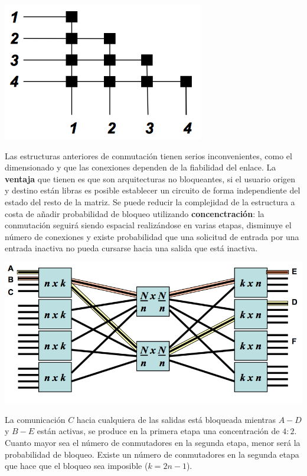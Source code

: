 \documentclass[10pt,portrait, twocolumn]{article}
\begin{document}
	\begin{center}
		\includegraphics[scale = 0.3]{triangular}
	\end{center}
	
Las estructuras anteriores de conmutación tienen serios inconvenientes, como el dimensionado y que las conexiones dependen de la fiabilidad del enlace. La \textbf{ventaja} que tienen es que son arquitecturas no bloqueantes, si el usuario origen y destino están libras es posible establecer un circuito de forma independiente del estado del resto de la matriz. Se puede reducir la complejidad de la estructura a costa de añadir probabilidad de bloqueo utilizando \textbf{concenctración}: la conmutación seguirá siendo espacial realizándose en varias etapas, disminuye el número de conexiones y existe probabilidad que una solicitud de entrada por una entrada inactiva no pueda cursarse hacia una salida que está inactiva.

	\begin{center}
		\includegraphics[scale = 0.3]{concentracion}
	\end{center}
	
La comunicación $C$ hacia cualquiera de las salidas está bloqueada mientras $A-D$ y $B-E$ están activas, se produce en la primera etapa una concentración de $4:2$. Cuanto mayor sea el número de conmutadores en la segunda etapa, menor será la probabilidad de bloqueo. Existe un número de conmutadores en la segunda etapa que hace que el bloqueo sea imposible ($k = 2n - 1$).
	
\end{document}
